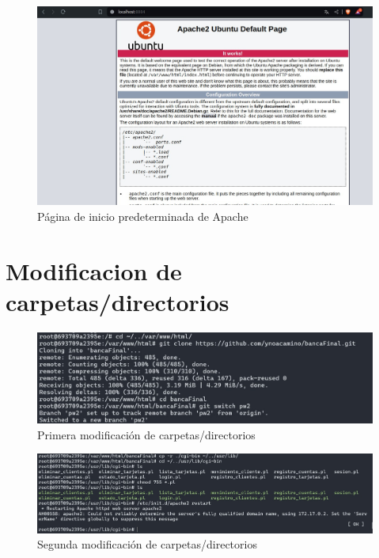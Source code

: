 \documentclass{article}
\begin{document}
\begin{figure}[htbp]
    \centering
    \includegraphics[width=1\textwidth]{latex/img/apache_check.png}
    \caption{Página de inicio predeterminada de Apache}
    \label{fig:apache_check}
\end{figure}

\clearpage

\section{Modificacion de carpetas/directorios}

\begin{figure}[htbp]
    \centering
    \includegraphics[width=1\linewidth]{latex/img/mod1.jpeg}
    \caption{Primera modificación de carpetas/directorios}
    \label{fig:mod1}
\end{figure}

\begin{figure}[htbp]
    \centering
    \includegraphics[width=1\linewidth]{latex/img/mod2.jpeg}
    \caption{Segunda modificación de carpetas/directorios}
    \label{fig:mod2}
\end{figure}
\end{document}
